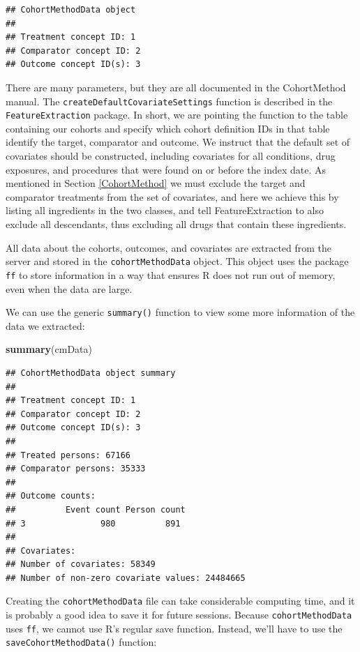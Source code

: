 \documentclass[]{book}
\newenvironment{Shaded}{\begin{snugshade}}{\end{snugshade}}
\newcommand{\KeywordTok}[1]{\textcolor[rgb]{0.13,0.29,0.53}{\textbf{#1}}}
\newcommand{\NormalTok}[1]{#1}
\begin{document}
\begin{verbatim}
## CohortMethodData object
## 
## Treatment concept ID: 1
## Comparator concept ID: 2
## Outcome concept ID(s): 3
\end{verbatim}

There are many parameters, but they are all documented in the
CohortMethod manual. The \texttt{createDefaultCovariateSettings}
function is described in the \texttt{FeatureExtraction} package. In
short, we are pointing the function to the table containing our cohorts
and specify which cohort definition IDs in that table identify the
target, comparator and outcome. We instruct that the default set of
covariates should be constructed, including covariates for all
conditions, drug exposures, and procedures that were found on or before
the index date. As mentioned in Section \ref{CohortMethod} we must
exclude the target and comparator treatments from the set of covariates,
and here we achieve this by listing all ingredients in the two classes,
and tell FeatureExtraction to also exclude all descendants, thus
excluding all drugs that contain these ingredients.

All data about the cohorts, outcomes, and covariates are extracted from
the server and stored in the \texttt{cohortMethodData} object. This
object uses the package \texttt{ff} to store information in a way that
ensures R does not run out of memory, even when the data are large.

We can use the generic \texttt{summary()} function to view some more
information of the data we extracted:

\begin{Shaded}
\begin{Highlighting}[]
\KeywordTok{summary}\NormalTok{(cmData)}
\end{Highlighting}
\end{Shaded}

\begin{verbatim}
## CohortMethodData object summary
## 
## Treatment concept ID: 1
## Comparator concept ID: 2
## Outcome concept ID(s): 3
## 
## Treated persons: 67166
## Comparator persons: 35333
## 
## Outcome counts:
##          Event count Person count
## 3               980          891
## 
## Covariates:
## Number of covariates: 58349
## Number of non-zero covariate values: 24484665
\end{verbatim}

Creating the \texttt{cohortMethodData} file can take considerable
computing time, and it is probably a good idea to save it for future
sessions. Because \texttt{cohortMethodData} uses \texttt{ff}, we cannot
use R's regular save function. Instead, we'll have to use the
\texttt{saveCohortMethodData()} function:
\end{document}
